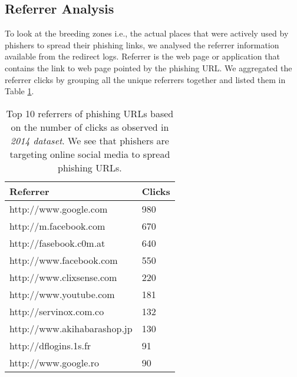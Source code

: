 \documentclass[conference]{IEEEtran}
\begin{document}
\subsection{Referrer Analysis}
To look at the breeding zones i.e., the actual places that were actively used by phishers to spread their phishing links, we analysed the referrer information available from the redirect logs. Referrer is the web page or application that contains the link to web page pointed by the phishing URL. We aggregated the referrer clicks by grouping all the unique referrers together and listed them in Table \ref{tab:referrer}.
\begin{table}[h]
\centering
\caption{Top 10 referrers of phishing URLs based on the number of clicks as observed in \textit{2014 dataset}. We see that phishers are targeting online social media to spread phishing URLs.}
\label{tab:referrer}
\begin{small}
\begin{tabular}{|p{5cm}|p{1.15cm}|} \hline
\small Referrer &\small Clicks \\ \hline
http://www.google.com & 980\\ \hline
http://m.facebook.com & 670\\ \hline
http://fasebook.c0m.at & 640 \\ \hline
http://www.facebook.com & 550\\ \hline
http://www.clixsense.com & 220 \\ \hline
http://www.youtube.com & 181 \\ \hline
http://servinox.com.co & 132 \\ \hline
http://www.akihabarashop.jp & 130 \\ \hline
http://dflogins.1s.fr & 91 \\ \hline
http://www.google.ro & 90 \\ \hline
\end{tabular}
\end{small}
\end{table}
\newline\indent
\end{document}
